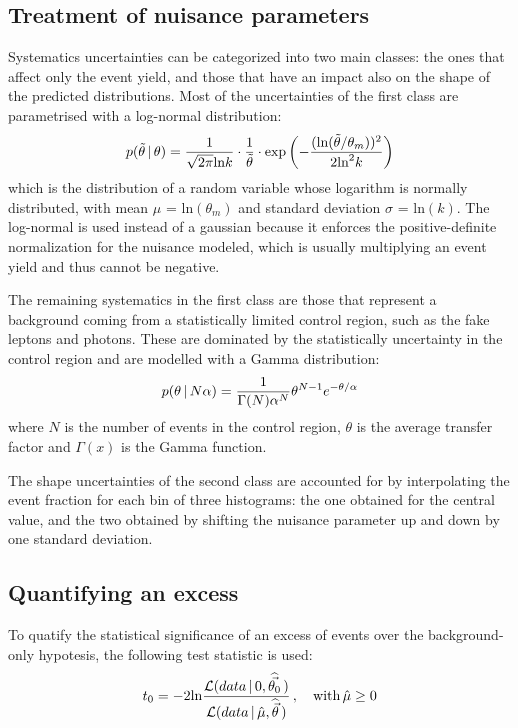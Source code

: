 \subsection{Treatment of nuisance parameters}
Systematics uncertainties can be categorized into two main classes: the ones that affect only the event yield, and those that have an impact also on the shape of the predicted distributions.
Most of the uncertainties of the first class are parametrised with a log-normal distribution:
\begin{equation}
  \label{eq:lnNdef}
  p(\tilde{\theta}\,|\,\theta) = \frac{1}{\sqrt{2 \pi} \text{ln} k} \cdot \frac{1}{\tilde{\theta}} \cdot \text{exp} \left( -\frac{(\text{ln}(\tilde{\theta}/\theta_m))^2}{2 \text{ln}^2 k} \right)
\end{equation}
which is the distribution of a random variable whose logarithm is normally distributed, with mean $\mu$ = $\text{ln}(\theta_m)$ and standard deviation $\sigma$ = $\text{ln}(k)$.
The log-normal is used instead of a gaussian because it enforces the positive-definite normalization for the nuisance modeled, which is usually multiplying an event yield and thus cannot be negative.

The remaining systematics in the first class are those that represent a background coming from a statistically limited control region, such as the fake leptons and photons.
These are dominated by the statistically uncertainty in the control region and are modelled with a Gamma distribution:
\begin{equation}
  \label{eq:gammadef}
  p(\theta\,|\,N\alpha) = \frac{1}{\Gamma(N) \alpha^N} \theta^{N-1} e^{-\theta/\alpha}
\end{equation}
where $N$ is the number of events in the control region, $\theta$ is the average transfer factor and $\Gamma(x)$ is the Gamma function.

The shape uncertainties of the second class are accounted for by interpolating the event fraction for each bin of three histograms: the one obtained for the central value, and the two obtained by shifting the nuisance parameter up and down by one standard deviation.

\subsection{Quantifying an excess}
To quatify the statistical significance of an excess of events over the background-only hypotesis, the following test statistic is used:
\begin{equation}
  \label{eq:test_statistic}
  t_0 = -2\text{ln} \frac {\mathcal{L}(data\,|\,0,\widehat{\vec{\theta_0}}\,)} {\mathcal{L}(data\,|\,\hat\mu,\widehat{\vec\theta}\,)}\,,\quad \text{with}\, \hat\mu \ge 0
\end{equation}

